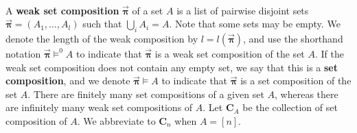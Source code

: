 \documentclass[12pt, reqno]{amsart}
\theoremstyle{definition}
\newcommand{\opi}{\vec{\boldsymbol{\pi}}}
\begin{document}
\

A \textbf{weak set composition} $\opi$ of a set $A$ is a list of pairwise disjoint sets $\opi = (A_1, \dots , A_l)$ such that $\bigcup_i A_i = A$.
Note that some sets may be empty.
We denote the length of the weak composition by $l= l(\opi)$, and use the shorthand notation $\opi \models^0 A$ to indicate that $\opi$ is a weak set composition of the set $A$.
If the weak set composition does not contain any empty set, we say that this is a \textbf{set composition}, and we denote $\opi \models A$ to indicate that $\opi$ is a set composition of the set $A$.
There are finitely many set compositions of a given set $A$, whereas there are infinitely many weak set compositions of $A$.
Let $\mathbf{C}_A$ be the collection of set composition of $A$.
We abbreviate to $\mathbf{C}_n$ when $A = [n]$.
\end{document}
